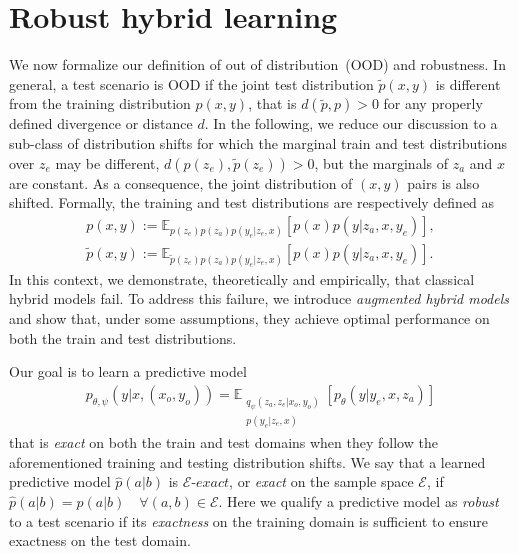\documentclass{article}
\begin{document}
\section{Robust hybrid learning}
We now formalize our definition of out of distribution~(OOD) and robustness. In general, a test scenario is OOD if the joint test distribution $\tilde{p}(x, y)$ is different from the training distribution $p(x, y)$, that is $d(\tilde{p}, p) > 0$ for any properly defined divergence or distance $d$. In the following, we reduce our discussion to a  sub-class of distribution shifts for which the marginal train and test distributions over $z_e$ may be different, $d(p(z_e),  \tilde{p}(z_e)) > 0$, but the marginals of $z_a$ and $x$ are constant. As a consequence, the joint distribution of $(x, y)$ pairs is also shifted. Formally, the training and test distributions are respectively defined as
\begin{align}
    p(x, y) := \mathbb{E}_{p(z_e) p(z_a) p(y_e|z_e, x)}\left[p(x) p(y|z_a, x, y_e) \right], \nonumber\\
    \tilde{p}(x, y) := \mathbb{E}_{\tilde{p}(z_e) p(z_a) p(y_e|z_e, x)}\left[p(x) p(y|z_a, x, y_e) \right]. \nonumber
\end{align}
In this context, we demonstrate, theoretically and empirically, that classical hybrid models fail. To address this failure, we introduce \textit{augmented hybrid models} and show that, under some assumptions, they achieve optimal performance on both the train and test distributions. 

Our goal is to learn a predictive model 
\begin{align}
    p_{\theta, \psi}(y|x, (x_o, y_o)) = \mathbb{E}_{\substack{q_\psi(z_a, z_e|x_o, y_o) \\ p(y_e|z_e, x)}}\left[ p_\theta(y|y_e, x, z_a)\right] \nonumber
\end{align} 
that is \textit{exact} on both the train and test domains when they follow the  aforementioned training and testing distribution shifts. We say that a learned predictive model $\hat{p}(a|b)$ is $\mathcal{E}\textit{-exact}$, or \textit{exact} on the sample space $\mathcal{E}$, if $\hat{p}(a|b) = p(a|b) \quad \forall (a, b) \in \mathcal{E}$. Here we qualify a predictive model as \textit{robust} to a test scenario if its \textit{exactness} on the training domain is sufficient to ensure exactness on the test domain. 
\end{document}
